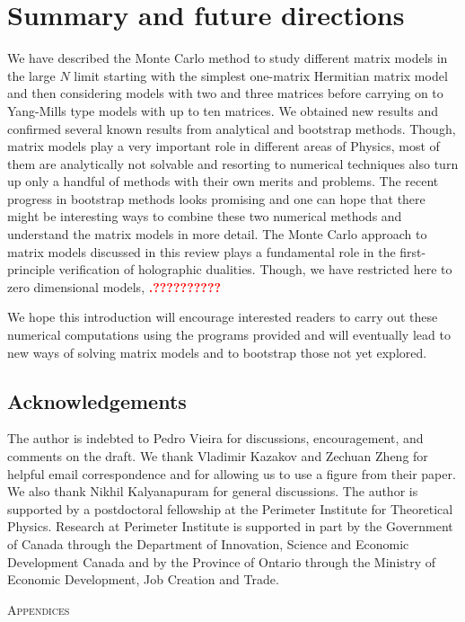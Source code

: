 \documentclass[letter,11pt]{article}
\newcommand{\TODO}[1]{\textcolor{red}{{\bf #1}}}
\begin{document}
\section{Summary and future directions}
We have described the Monte Carlo method to study different matrix models in the large $N$ limit starting with the simplest one-matrix Hermitian matrix model and then considering models with two and three matrices before carrying on to Yang-Mills type models with up to ten matrices. We obtained new results and confirmed several known results from analytical and bootstrap methods. Though, matrix models play a very important role in different areas of Physics, most of them are analytically not solvable and resorting to numerical techniques also turn up only a handful of methods with their own merits and problems. The recent progress in bootstrap methods looks promising and one can hope that there might be interesting ways to combine these two numerical methods and understand the matrix models in more detail. The Monte Carlo approach
to matrix models discussed in this review plays a fundamental role in the first-principle verification of holographic dualities. Though, we have restricted here to zero dimensional models, 
\TODO{.??????????} 

We hope this introduction will encourage interested readers to carry out these numerical computations using the programs provided and will eventually lead to new ways of solving matrix models and to bootstrap those not yet explored.
\vspace{8mm}
\subsection*{Acknowledgements}
The author is indebted to Pedro Vieira
for discussions, encouragement, and comments on the draft.
We thank Vladimir Kazakov 
and Zechuan Zheng for helpful email correspondence and for 
allowing us to use a figure from their paper. 
We also thank Nikhil Kalyanapuram for general discussions. 
The author is supported by a 
postdoctoral fellowship at the Perimeter Institute for Theoretical Physics. 
Research at Perimeter Institute is supported in part by the Government of Canada 
through the Department of Innovation, Science and Economic Development Canada 
and by the Province of Ontario through the Ministry of Economic Development, Job Creation 
and Trade. 
\vspace{6mm}
\appendix
\begin{center} \large{\textsc{Appendices}}\end{center}
\end{document}
